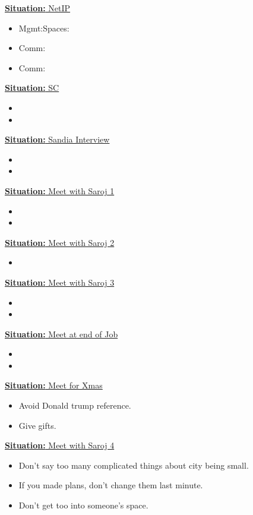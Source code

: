\documentclass[11pt]{article}
\newcommand{\newSituation}[1]{\underline{\textbf{Situation:} #1} }
\begin{document}
{\newSituation{NetIP}
\begin{itemize}
\tiny \item \tiny Mgmt:Spaces: 
\tiny \item \tiny Comm: 
\tiny \item \tiny Comm: 
\end{itemize} 

\newSituation{SC} 
\begin{itemize} 
\item \tiny 
\item \tiny 
\end{itemize} 

\newSituation{Sandia Interview} 
\begin{itemize}  
\item \tiny 
\item \tiny 
\end{itemize} 


\newSituation{Meet with Saroj 1} 
\begin{itemize} 
\tiny \item \tiny 
\item \tiny 
\end{itemize} 

\newSituation{Meet with Saroj 2}

\begin{itemize}

\tiny \item 
\end{itemize} 

\newSituation{Meet with Saroj 3} 
\begin{itemize}
\tiny \item \tiny 
\item \tiny 
\end{itemize} 

\newSituation{Meet at end of Job} 
\begin{itemize} 
\tiny \item \tiny 
\tiny \item \tiny 
\end{itemize} 

\newSituation{Meet for Xmas} 
\begin{itemize} 
\item \tiny Avoid Donald trump reference. 
\item \tiny Give gifts. 
\end{itemize}  




\newSituation{Meet with Saroj 4}
\begin{itemize}
\tiny \item \tiny Don't say too many complicated things about city
being small.  
\item \tiny If you made plans, don't change them last minute. 
\item \tiny Don't get too into someone's space. 
\end{itemize}

}
\end{document}
